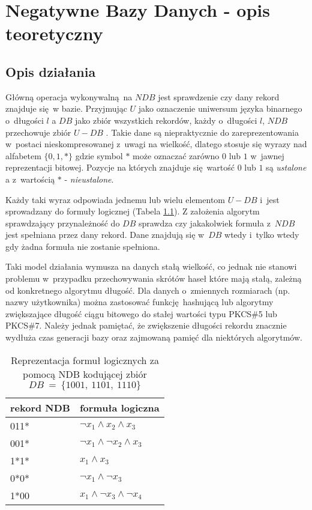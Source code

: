 \chapter{Negatywne Bazy Danych - opis teoretyczny}
\section{Opis działania}
Główną operacja wykonywalną na $NDB$ jest sprawdzenie czy dany rekord znajduje się w bazie. Przyjmując $U$ 
jako oznaczenie uniwersum języka binarnego o~długości $l$ a $DB$ jako zbiór wszystkich rekordów, każdy o~długości $l$,
$NDB$ przechowuje zbiór $U - DB$ \cite{NRI-Esponda}. Takie dane są niepraktycznie do zareprezentowania w~postaci nieskompresowanej z~uwagi na wielkość, dlatego
stosuje się wyrazy nad alfabetem $\{0,1,*\}$ gdzie symbol $*$ może oznaczać zarówno $0$ lub $1$ w~jawnej reprezentacji bitowej.
Pozycje na których znajduje się wartość $0$ lub $1$ są \textit{ustalone} a z~wartością $*$ - \textit{nieustalone}.

Każdy taki wyraz odpowiada jednemu lub wielu elementom $U - DB$ i~jest sprowadzany do formuły logicznej (Tabela \ref{Tbl:NDB-logform}).
Z założenia algorytm sprawdzający przynależność do $DB$ sprawdza czy jakakolwiek formuła z~$NDB$ jest spełniana przez dany rekord. 
Dane znajdują się w~$DB$ wtedy i~tylko wtedy gdy żadna formuła nie zostanie spełniona. 

Taki model działania wymusza na danych stałą wielkość,
co jednak nie stanowi problemu w~przypadku przechowywania skrótów haseł które mają stałą, zależną od konkretnego algorytmu długość.
Dla danych o~zmiennych rozmiarach (np. nazwy użytkownika) można zastosować funkcję hashującą lub algorytmy zwiększające długość ciągu bitowego do stałej wartości typu PKCS\#5 lub PKCS\#7.
Należy jednak pamiętać, że zwiększenie długości rekordu znacznie wydłuża czas generacji bazy oraz zajmowaną pamięć dla niektórych algorytmów. 

\begin{table}[h]
    \centering

    \begin{tabular}{|l|l|}
    	\hline
    	rekord NDB & formuła logiczna                      \\ \hline
    	011*       & $ \neg x_1 \land x_2 \land x_3$       \\ \hline
    	001*       & $ \neg x_1 \land \neg x_2 \land x_3 $ \\ \hline
    	1*1*       & $x_1 \land x_3 $                      \\ \hline
    	0*0*       & $\neg x_1 \land \neg x_3 $            \\ \hline
    	1*00       & $x_1 \land \neg x_3 \land  \neg x_4$  \\ \hline
    \end{tabular}
    
    \caption{Reprezentacja formuł logicznych za pomocą NDB kodującej zbiór $DB~=~\{1001,~1101,~1110\}$}
    \label{Tbl:NDB-logform}
\end{table}

